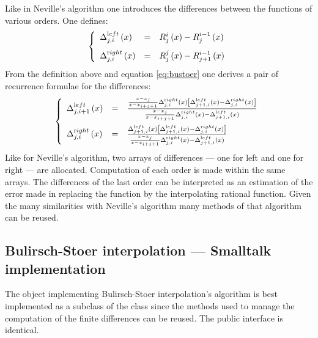 Like in Neville's algorithm one introduces the differences between
the functions of various orders. One defines:
\begin{equation}
\left\{
\begin{array}{lcl}
    \Delta_{j,i}^{\mathop{\textrm
left}}\left(x\right) & = & R_j^i\left(x\right) -
R_j^{i-1}\left(x\right)\\*[2ex]
    \Delta_{j,i}^{\mathop{\textrm
right}}\left(x\right) & = & R_j^j\left(x\right) -
R_{j+1}^{i-1}\left(x\right)
  \end{array}\right.
\end{equation}
From the definition above and equation \ref{eq:bustoer} one
derives a pair of recurrence formulae for the differences:
\begin{equation}
\left\{
\begin{array}{lcl}
    \Delta_{j,i+1}^{\mathop{\textrm
left}}\left(x\right) & = &{{x-x_j \over x - x_{i+j+1}}
\Delta_{j,i}^{\mathop{\textrm right}}\left(x\right)
\left[\Delta_{j+1,i}^{\mathop{\textrm left}}\left(x\right) -
\Delta_{j,i}^{\mathop{\textrm right}}\left(x\right)\right] \over
{x-x_j \over x-x_{i+j+1}} \Delta_{j,i}^{\mathop{\textrm
right}}\left(x\right) - \Delta_{j+1,i}^{\mathop{\textrm
left}}\left(x\right)}
\\*[3ex]
    \Delta_{j,i}^{\mathop{\textrm
right}}\left(x\right) & = &{ \Delta_{j+1,i}^{\mathop{\textrm
left}}\left(x\right) \left[\Delta_{j+1,i}^{\mathop{\textrm
left}}\left(x\right) - \Delta_{j,i}^{\mathop{\textrm
right}}\left(x\right)\right] \over {x-x_j \over x-x_{i+j+1}}
\Delta_{j,i}^{\mathop{\textrm right}}\left(x\right) -
\Delta_{j+1,i}^{\mathop{\textrm left}}\left(x\right)}
  \end{array}\right.
\end{equation}
Like for Neville's algorithm, two arrays of differences --- one
for left and one for right --- are allocated. Computation of each
order is made within the same arrays. The differences of the last
order can be interpreted as an estimation of the error made in
replacing the function by the interpolating rational function.
Given the many similarities with Neville's algorithm many methods
of that algorithm can be reused.

\subsection{Bulirsch-Stoer interpolation --- Smalltalk implementation}

 The object implementing
Bulirsch-Stoer interpolation's algorithm is best implemented as a
subclass of the class  since the
methods used to manage the computation of the finite differences
can be reused. The public interface is identical.

